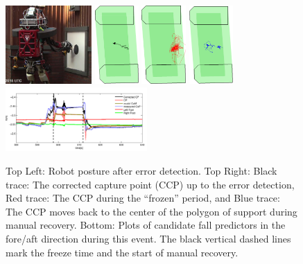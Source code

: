 \documentclass[letterpaper,12pt,fullpage]{article}
\begin{document}
\begin{figure}[t]
      \centering
      \includegraphics[height=30mm]{figs/near-fall2c.png}
      \includegraphics[height=30mm]{figs/drill-cop1.png}
      \includegraphics[height=30mm]{figs/drill-cop2.png}
      \includegraphics[height=30mm]{figs/drill-cop3.png}\\
\includegraphics[width=0.48\textwidth]{figs/cp_time_xes.pdf}
      \caption{Top Left: Robot posture after 
error detection.
Top Right: Black trace: The corrected capture point (CCP)
up to the error detection,
Red trace: The CCP during the ``frozen'' period, and Blue trace: The CCP moves
back to the center of the polygon of support during manual recovery.
Bottom: Plots of candidate fall predictors in the fore/aft direction
during this event. The black vertical dashed lines mark the freeze time and
the start of manual recovery.}
      \label{figDrillCOP}
\end{figure}
\end{document}

